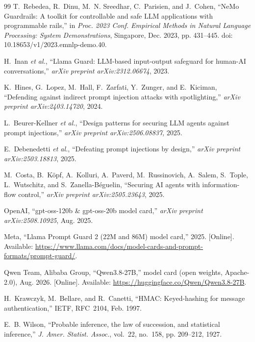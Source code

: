 \documentclass[conference]{IEEEtran}
\begin{document}
\begin{thebibliography}{99}
T.~Rebedea, R.~Dinu, M.~N. Sreedhar, C.~Parisien, and J.~Cohen,
``NeMo Guardrails: A toolkit for controllable and safe LLM applications with
programmable rails,''
in \emph{Proc. 2023 Conf. Empirical Methods in Natural Language Processing:
System Demonstrations}, Singapore, Dec. 2023, pp. 431--445.
doi: 10.18653/v1/2023.emnlp-demo.40.

H.~Inan \emph{et al.},
``Llama Guard: LLM-based input-output safeguard for human-AI conversations,''
\emph{arXiv preprint arXiv:2312.06674}, 2023.

K.~Hines, G.~Lopez, M.~Hall, F.~Zarfati, Y.~Zunger, and E.~Kiciman,
``Defending against indirect prompt injection attacks with spotlighting,''
\emph{arXiv preprint arXiv:2403.14720}, 2024.

L.~Beurer-Kellner \emph{et al.},
``Design patterns for securing LLM agents against prompt injections,''
\emph{arXiv preprint arXiv:2506.08837}, 2025.

E.~Debenedetti \emph{et al.},
``Defeating prompt injections by design,''
\emph{arXiv preprint arXiv:2503.18813}, 2025.

M.~Costa, B.~K\"{o}pf, A.~Kolluri, A.~Paverd, M.~Russinovich, A.~Salem,
S.~Tople, L.~Wutschitz, and S.~Zanella-B\'{e}guelin,
``Securing AI agents with information-flow control,''
\emph{arXiv preprint arXiv:2505.23643}, 2025.

{OpenAI}, ``gpt-oss-120b \& gpt-oss-20b model card,''
\emph{arXiv preprint arXiv:2508.10925}, Aug. 2025.

{Meta}, ``Llama Prompt Guard 2 (22M and 86M) model card,'' 2025. [Online].
Available: \url{https://www.llama.com/docs/model-cards-and-prompt-formats/prompt-guard/}.

{Qwen Team, Alibaba Group}, ``Qwen3.8-27B,'' model card (open weights, Apache-2.0),
Aug. 2026. [Online]. Available: \url{https://huggingface.co/Qwen/Qwen3.8-27B}.

H.~Krawczyk, M.~Bellare, and R.~Canetti,
``HMAC: Keyed-hashing for message authentication,''
IETF, RFC~2104, Feb. 1997.

E.~B. Wilson,
``Probable inference, the law of succession, and statistical inference,''
\emph{J. Amer. Statist. Assoc.}, vol.~22, no.~158, pp. 209--212, 1927.


\end{thebibliography}
\end{document}
